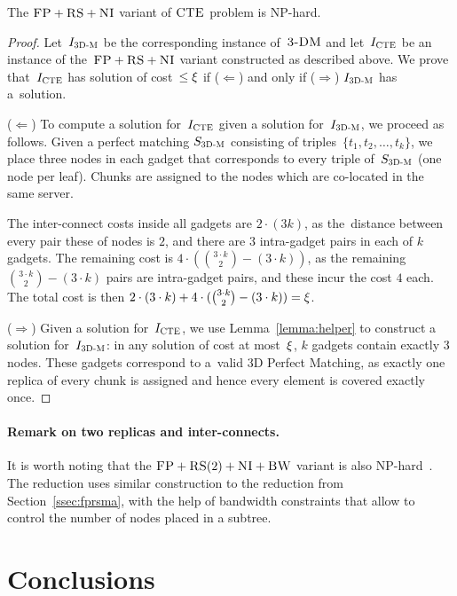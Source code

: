 \begin{theorem}
\label{theorem:fp_rs_cc}
The $\textsc{FP}+\textsc{RS}+\textsc{NI}$ variant of $\textsc{CTE}$ problem is NP-hard.
\end{theorem}
\begin{proof}
Let~$I_{\mathrm{\textsc{3D-M}}}$ be the corresponding instance of~$\textsc{3-DM}$ and let~$I_{\mathrm{\textsc{CTE}}}$ be an instance of
the~$\textsc{FP}+\textsc{RS}+\textsc{NI}$ variant constructed as described above.
We prove that~$I_{\mathrm{\textsc{CTE}}}$ has solution of cost~$\leq \xi$ if ($\Leftarrow$) and only if
($\Rightarrow$)
$I_{\mathrm{\textsc{3D-M}}}$ has a~solution.

($\Leftarrow$) To compute a solution
for~$I_{\mathrm{\textsc{CTE}}}$ given a solution for~$I_{\mathrm{\textsc{3D-M}}}$, we proceed as follows.
Given a perfect matching $S_{\mathrm{\textsc{3D-M}}}$ consisting of triples~$ \{t_1, t_2,
\ldots, t_k\}$, we place three nodes in each gadget that
corresponds to every triple of~$S_{\mathrm{\textsc{3D-M}}}$ (one node per leaf). Chunks are assigned to the nodes which are co-located
in the same server.

The inter-connect costs inside all gadgets are $2\cdot (3 k)$,
as the~distance between every pair these of nodes is $2$, and there are $3$ intra-gadget pairs in each of $k$ gadgets.
The remaining cost is $4\cdot({ 3\cdot k \choose 2} - (3\cdot k))$, as the remaining ${ 3\cdot k \choose 2} - (3\cdot k)$ pairs are intra-gadget pairs, and these incur the cost $4$ each.
The total cost is then $2\cdot (3\cdot k) + 4\cdot({ 3\cdot k \choose 2} - (3\cdot k)) = \xi$.

($\Rightarrow$) Given a solution for~$I_{\mathrm{\textsc{CTE}}}$,
we use Lemma~\ref{lemma:helper} to construct a solution for~$I_{\mathrm{\textsc{3D-M}}}$: in any solution of cost at most~$\xi$,
$k$ gadgets contain exactly 3 nodes. These gadgets correspond to a~valid
3D Perfect Matching, as exactly one replica of every chunk is assigned and
hence every element is covered exactly once.
\end{proof}

\paragraph{Remark on two replicas and inter-connects.}
It is worth noting that the $\textsc{FP}+\textsc{RS}(2)+\textsc{NI}+\textsc{BW}$ variant is also NP-hard~\cite{my-tcs}.
The reduction uses similar construction to the reduction from Section~\ref{ssec:fprsma},
with the help of bandwidth constraints that allow to control the number of nodes placed in a subtree.

\section{Conclusions}\label{sec:conclusion-static}


